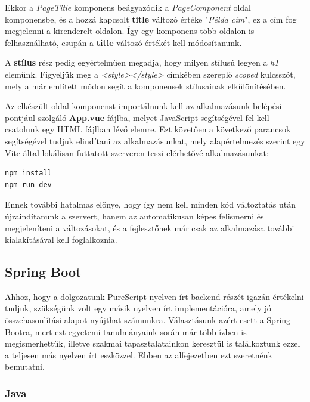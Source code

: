 \documentclass[12pt]{article}
\begin{document}
Ekkor a \textit{PageTitle} komponens beágyazódik a \textit{PageComponent} oldal komponensbe, és a hozzá kapcsolt \textbf{title} változó értéke "\textit{Példa cím}", ez a cím fog megjelenni a kirenderelt oldalon. Így egy komponens több oldalon is felhasználható, csupán a \textbf{title} változó értékét kell módosítanunk.

A \textbf{stílus} rész pedig egyértelműen megadja, hogy milyen stílusú legyen a \textit{h1} elemünk. Figyeljük meg a \textit{<style></style>} címkében szereplő \textit{scoped} kulcsszót, mely a már említett módon segít a komponensek stílusainak elkülönítésében.

Az elkészült oldal komponenst importálnunk kell az alkalmazásunk belépési pontjául szolgáló \textbf{App.vue} fájlba, melyet JavaScript segítségével fel kell csatolunk egy HTML fájlban lévő elemre. Ezt követően a következő parancsok segítségével tudjuk elindítani az alkalmazásunkat, mely alapértelmezés szerint egy Vite \cite{https://vitejs.dev/} által lokálisan futtatott szerveren teszi elérhetővé alkalmazásunkat:
\begin{verbatim}
npm install
npm run dev
\end{verbatim}

Ennek további hatalmas előnye, hogy így nem kell minden kód változtatás után újraindítanunk a szervert, hanem az automatikusan képes felismerni és megjeleníteni a változásokat, és a fejlesztőnek már csak az alkalmazása további kialakításával kell foglalkoznia.

\subsection{Spring Boot}

Ahhoz, hogy a dolgozatunk PureScript nyelven írt backend részét igazán értékelni tudjuk, szükségünk volt egy másik nyelven írt implementációra, amely jó összehasonlítási alapot nyújthat számunkra. Választásunk azért esett a Spring Bootra, mert ezt egyetemi tanulmányaink során már több ízben is megismerhettük, illetve szakmai tapasztalatainkon keresztül is találkoztunk ezzel a teljesen más nyelven írt eszközzel. Ebben az alfejezetben ezt szeretnénk bemutatni.

\subsubsection{Java}
\end{document}
